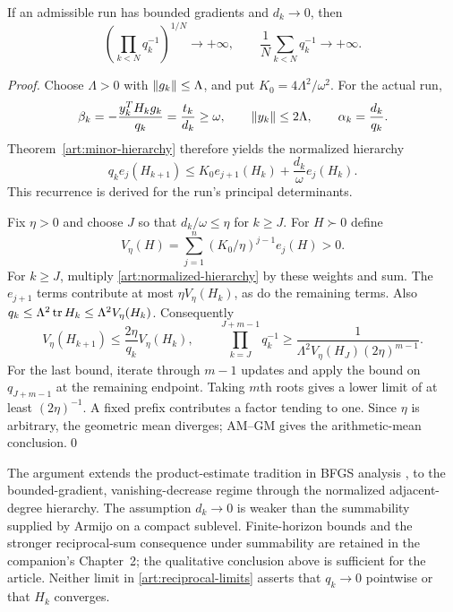 \begin{theorem}\label{art:reciprocal-growth}
If an admissible run has bounded gradients and $d_k\to0$, then
\begin{equation}\label{art:reciprocal-limits}
 \left(\prod_{k<N}q_k^{-1}\right)^{1/N}\longrightarrow+\infty,
 \qquad \frac1N\sum_{k<N}q_k^{-1}\longrightarrow+\infty.
\end{equation}
\end{theorem}
\begin{proof}
Choose $\Lambda>0$ with $\lVert g_k\rVert\le\Lambda$, and put $K_0=4\Lambda^2/\omega^2$.
For the actual run,
\[
 \beta_k=-\frac{y_k^TH_kg_k}{q_k}=\frac{t_k}{d_k}\ge \omega,\qquad
 \lVert y_k\rVert\le2\Lambda,\qquad \alpha_k=\frac{d_k}{q_k}.
\]
Theorem~\ref{art:minor-hierarchy} therefore yields the normalized hierarchy
\begin{equation}\label{art:normalized-hierarchy}
 q_ke_j(H_{k+1})\le
 K_0e_{j+1}(H_k)+\frac{d_k}{\omega}e_j(H_k).
\end{equation}
This recurrence is derived for the run's principal determinants.

Fix $\eta>0$ and choose $J$ so that $d_k/\omega\le\eta$ for $k\ge J$.
For $H\succ0$ define
\[
 V_\eta(H)=\sum_{j=1}^n(K_0/\eta)^{j-1}e_j(H)>0.
\]
For $k\ge J$, multiply \eqref{art:normalized-hierarchy} by these weights and sum. The
$e_{j+1}$ terms contribute at most $\eta V_\eta(H_k)$, as do the remaining
terms. Also $q_k\le\Lambda^2\operatorname{tr} H_k\le\Lambda^2V_\eta(H_k)$. Consequently
\[
 V_\eta(H_{k+1})\le\frac{2\eta}{q_k}V_\eta(H_k),\qquad
 \prod_{k=J}^{J+m-1}q_k^{-1}
 \ge\frac{1}{\Lambda^2V_\eta(H_J)(2\eta)^{m-1}}.
\]
For the last bound, iterate through $m-1$ updates and apply the bound on
$q_{J+m-1}$ at the remaining endpoint. Taking $m$th roots gives a lower
limit of at least $(2\eta)^{-1}$. A fixed prefix contributes a factor tending
to one. Since $\eta$ is arbitrary, the geometric mean diverges; AM--GM gives
the arithmetic-mean conclusion.\qed
\end{proof}

The argument extends the product-estimate tradition in BFGS analysis
\cite[Theorem~3.7]{S16}, \cite[Appendices C--D]{FND_JJM24AW} to the
bounded-gradient, vanishing-decrease regime through the normalized
adjacent-degree hierarchy. The assumption $d_k\to0$ is weaker than the
summability supplied by Armijo on a compact sublevel. Finite-horizon bounds
and the stronger reciprocal-sum consequence under summability are retained
in the companion's Chapter~2; the qualitative conclusion above is sufficient
for the article. Neither limit in \eqref{art:reciprocal-limits} asserts that
$q_k\to0$ pointwise or that $H_k$ converges.

